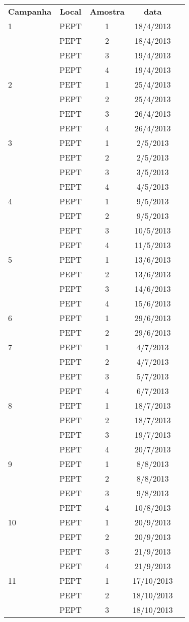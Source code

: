 \begin{tabular}{lcccc}  
\textbf{Campanha} & \textbf{Local} & \textbf{Amostra} & \textbf{data} \\
1 & PEPT & 1 & 18/4/2013\\
 &PEPT&2&18/4/2013\\
 &PEPT&3&19/4/2013\\
 &PEPT&4&19/4/2013\\
2&PEPT&1&25/4/2013\\
&PEPT&2&25/4/2013\\
&PEPT&3&26/4/2013\\
&PEPT&4&26/4/2013\\
3&PEPT&1&2/5/2013\\
&PEPT&2&2/5/2013\\
&PEPT&3&3/5/2013\\
&PEPT&4&4/5/2013\\
4&PEPT&1&9/5/2013\\
&PEPT&2&9/5/2013\\
&PEPT&3&10/5/2013\\
&PEPT&4&11/5/2013\\
5&PEPT&1&13/6/2013\\
&PEPT&2&13/6/2013\\
&PEPT&3&14/6/2013\\
&PEPT&4&15/6/2013\\
6&PEPT&1&29/6/2013\\
&PEPT&2&29/6/2013\\
7&PEPT&1&4/7/2013\\
&PEPT&2&4/7/2013\\
&PEPT&3&5/7/2013\\
&PEPT&4&6/7/2013\\
8&PEPT&1&18/7/2013\\
&PEPT&2&18/7/2013\\
&PEPT&3&19/7/2013\\
&PEPT&4&20/7/2013\\
9&PEPT&1&8/8/2013\\
&PEPT&2&8/8/2013\\
&PEPT&3&9/8/2013\\
&PEPT&4&10/8/2013\\
10&PEPT&1&20/9/2013\\
&PEPT&2&20/9/2013\\
&PEPT&3&21/9/2013\\
&PEPT&4&21/9/2013\\
11&PEPT&1&17/10/2013\\
&PEPT&2&18/10/2013\\
&PEPT&3&18/10/2013\\

\end{tabular}
